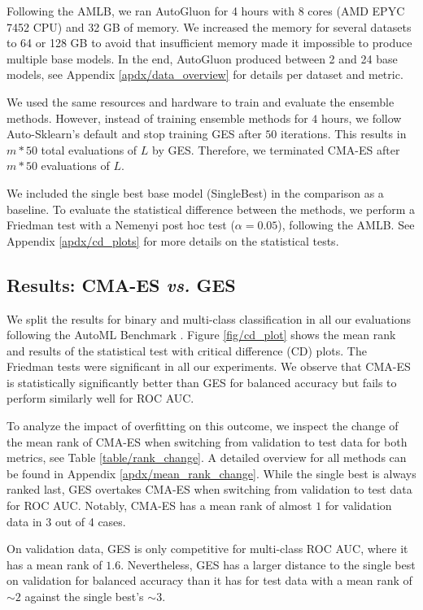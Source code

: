 \documentclass[11pt]{article}
\newcommand{\nbc}[3]{
		{\colorbox{#3}{\bfseries\sffamily\scriptsize\textcolor{white}{#1}}}
		{\textcolor{#3}{\sf\small$\blacktriangleright$\textit{#2}$\blacktriangleleft$}}
}
\newcommand{\changed}[1]{\nbc{CHANGED}{#1}{changedcolor}}
\renewcommand{\changed}[1]{{\color{changedcolor}#1}}
\renewcommand{\changed}[1]{{#1}}
\begin{document}
Following the AMLB, we ran AutoGluon for 4 hours with 8 cores (AMD EPYC 7452 CPU) and 32 GB of memory. We increased the memory for several datasets to 64 or 128 GB to avoid that insufficient memory made it impossible to produce multiple base models. In the end, AutoGluon produced between 2 and 24 base models, see Appendix \ref{apdx/data_overview} for details per dataset and metric.

We used the same resources and hardware to train and evaluate the ensemble methods.
However, instead of training ensemble methods for $4$ hours, we follow Auto-Sklearn's default and stop training GES after $50$ iterations. 
This results in $m*50$ total evaluations of $L$ by GES. 
Therefore, we terminated CMA-ES after $m*50$ evaluations of $L$. 

We included the single best base model (SingleBest) in the comparison as a baseline. 
To evaluate the statistical difference between the methods, we perform a Friedman test with a Nemenyi post hoc test ($\alpha = 0.05$), following the AMLB.
\changed{See Appendix \ref{apdx/cd_plots} for more details on the statistical tests.}

\subsection{Results: CMA-ES \emph{vs.} GES}
\label{sec/cma-es-compare-results}
We split the results for binary and multi-class classification in all our evaluations following the AutoML Benchmark \citep{automl_benchmark_2022}.
Figure \ref{fig/cd_plot} shows the mean rank and results of the statistical test with critical difference (CD) plots. \changed{The Friedman tests were significant in all our experiments.}
We observe that CMA-ES is statistically significantly better than GES for balanced accuracy but fails to perform similarly well for ROC AUC. 

To analyze the impact of overfitting on this outcome, we inspect the change of the mean rank of CMA-ES when switching from validation to test data for both metrics, see Table \ref{table/rank_change}. 
\changed{A detailed overview for all methods can be found in Appendix \ref{apdx/mean_rank_change}.}
While the single best is always ranked last, GES overtakes CMA-ES when switching from validation to test data for ROC AUC. 
Notably, CMA-ES has a mean rank of almost $1$ for validation data in 3 out of 4 cases.

On validation data, GES is only competitive for multi-class ROC AUC, where it has a mean rank of $1.6$.  
Nevertheless, GES has a larger distance to the single best on validation for balanced accuracy than it has for test data with a mean rank of ${\sim}2$ against the single best's ${\sim}3$.
\end{document}
